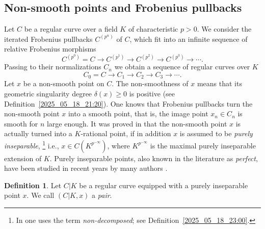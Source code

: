 \documentclass[12pt,reqno]{amsart}%
\theoremstyle{definition}
\newtheorem{defn}[prop]{Definition}
\theoremstyle{remark}
\newcommand{\de}{\delta}
\begin{document}
\subsection{Non-smooth points and Frobenius pullbacks}
Let $C$ be a regular curve over a field $K$ of characteristic $p>0$. 
We consider the iterated Frobenius pullbacks $C^{(p^n)}$ of $C$, which fit into an infinite sequence of relative Frobenius morphisms
\[ C^{(p^0)} = C\to C^{(p^1)} \to C^{(p^2)} \to C^{(p^3)} \to \cdots. \]
Passing to their normalizations $C_n$ we obtain a sequence of regular curves over $K$
\[ C_0 = C \to C_1 \to C_2 \to C_3 \to \cdots. \]
Let $x$ be a non-smooth point on $C$. %
The non-smoothness of $x$ means that its geometric singularity degree $\de(x) \geq 0$ is positive (see Definition~\ref{2025_05_18_21:20}).
One knows that Frobenius pullbacks turn the non-smooth point $x$ into a smooth point, that is, the image point $x_n \in C_n$ is smooth for $n$ large enough.
It was proved in \cite{HiSt22} that the non-smooth point $x$ is actually turned into a $K$-rational point, if in addition $x$ is assumed to be \emph{purely inseparable}, 
\footnote{In \cite{HiSt22} one uses the term \emph{non-decomposed}; see Definition~\ref{2025_05_18_23:00}.}
i.e., $x \in C(K^{p^{-\infty}})$, where $K^{p^{-\infty}}$ is the maximal purely inseparable extension of $K$.
Purely inseparable points, also known in the literature as \emph{perfect}, have been studied in recent years by many authors \cite{Ghi10,Ros15,Ros20,Yuan21,BL22,Amb23}.


\begin{defn}
Let $C|K$ be a regular curve equipped with a purely inseparable point $x$. We call $(C|K,x)$ a \emph{pair}.
\end{defn}
\end{document}

